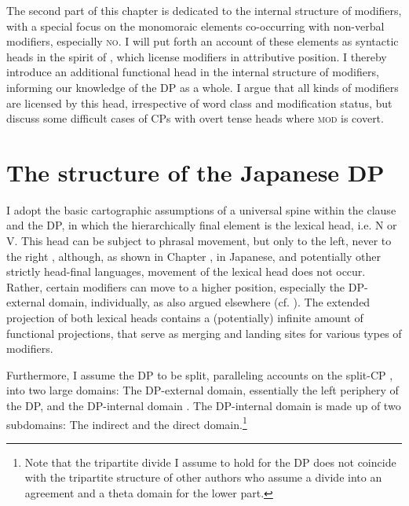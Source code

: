 \documentclass [output=book,colorlinks,citecolor=brown]{langscibook}
\begin{document}
The second part of this chapter is dedicated to the internal structure of modifiers, with a special focus on the monomoraic elements co-occurring with non-verbal modifiers, especially \textsc{no}. I will put forth an account of these elements as syntactic heads in the spirit of \citet{rubin:1993:category, rubin:1994:mod, rubin:1996:transparent}, which license modifiers in attributive position. I thereby introduce an additional functional head in the internal structure of modifiers, informing our knowledge of the DP as a whole. I argue that all kinds of modifiers are licensed by this head, irrespective of word class and modification status, but discuss some difficult cases of CPs with overt tense heads where \textsc{mod} is covert.

\section{The structure of the Japanese DP} \label{japanesedp}

I adopt the basic cartographic assumptions of a universal spine within the clause and the DP, in which the hierarchically final element is the lexical head, i.e. N or V. This head can be subject to phrasal movement, but only to the left, never to the right \citep{kayne:1994:anti, cinque:2005:deriving, cinque:2023:linearization}, although, as shown in Chapter , in Japanese, and potentially other strictly head-final languages, movement of the lexical head does not occur. Rather, certain modifiers can move to a higher position, especially the DP-external domain, individually, as also argued elsewhere (cf. \citealt{kim:2019:syntax, laenzlinger:2005:french, laenzlinger:2011:elements}). The extended projection of both lexical heads contains a (potentially) infinite amount of functional projections, that serve as merging and landing sites for various types of modifiers.

Furthermore, I assume the DP to be split, paralleling accounts on the split-CP \citep{rizzi:1997:the, grohmann:2003:prolific, laenzlinger:2011:elements,}, into two large domains: The DP-external domain, essentially the left periphery of the DP, and the DP-internal domain \citep{kiss:1998:identificational, kiss:2007:topic, giusti:1996:is, dimitrova:1998:fragments, ihsane:2001:specific, aboh:2004:topic, aboh:2006:when, laenzlinger:2005:french, kim:2019:syntax}. The DP-internal domain is made up of two subdomains: The indirect and the direct domain.\footnote{Note that the tripartite divide I assume to hold for the DP does not coincide with the tripartite structure of other authors \citep{laenzlinger:2011:elements, grohmann:2003:prolific} who assume a divide into an agreement and a theta domain for the lower part.}
\end{document}
